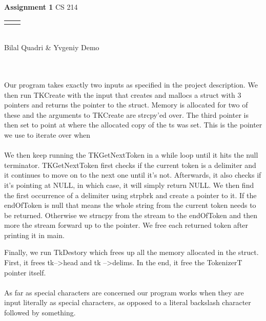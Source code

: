\documentclass[12pt]{article}
\renewcommand{\title}[1]{\textbf{#1}}
\renewcommand{\line}{\begin{tabularx}{\textwidth}{X>{\raggedleft}X}\hline\\\end{tabularx}\\[-0.5cm]}
\begin{document}
\title{Assignment 1}
\hfill CS 214
\line
Bilal Quadri \& Yvgeniy Demo
\\\\\\
\setlength{\parindent}{14pt} %


Our program takes exactly two inputs as specified in the project description. We then run TKCreate with the input that creates and mallocs a struct with 3 pointers and returns the pointer to the struct. Memory is allocated for two of these and the arguments to TKCreate are strcpy'ed over. The third pointer is then set to point at where the allocated copy of the ts was set. This is the pointer we use to iterate over when 
\\\\
We then keep running the TKGetNextToken in a while loop until it hits the null terminator. TKGetNextToken first checks if the current token is a delimiter and it continues to move on to the next one until it's not. Afterwards, it also checks if it's pointing at NULL, in which case, it will simply return NULL. We then find the first occurrence of a delimiter using strpbrk and create a pointer to it. If the endOfToken is null that means the whole string from the current token needs to be returned. Otherwise we strncpy from the stream to the endOfToken and then more the stream forward up to the pointer. We free each returned token after printing it in main.

Finally, we run TkDestory which frees up all the memory allocated in the struct. First, it frees tk--\textgreater  head and tk --\textgreater delims. In the end, it free the TokenizerT pointer itself.
\\\\
As far as special characters are concerned our program works when they are input literally as special characters, as opposed to a literal backslash character followed by something.
\end{document}
